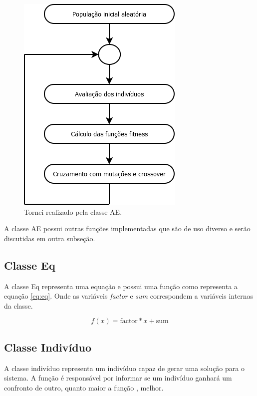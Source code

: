 \begin{figure}[htb]
    \caption{Tornei realizado pela classe AE.}
    \label{figura:funcao_playAll}
    \centering
    \includegraphics[scale=1]{images/dia/fluxograma-ae}
    \fautor
\end{figure}

A classe AE possui outras funções implementadas que são de uso diverso e serão discutidas em outra subseção.

\subsection{Classe Eq}

\newcommand{\var}[1]{\textit{#1}}

A classe Eq representa uma equação e possui uma função como representa a equação \ref{eq:eq}. Onde as variáveis \var{factor} e \var{sum} correspondem a variáveis internas da classe.

\begin{equation}
    \label{eq:eq}
    f(x)=\mathrm{factor}*x + \mathrm{sum}
\end{equation}

\subsection{Classe Indivíduo}

A classe indivíduo representa um indivíduo capaz de gerar uma solução para o sistema. A função \fitness é responsável por informar se um indivíduo ganhará um confronto de outro, quanto maior a função \fitness, melhor.


